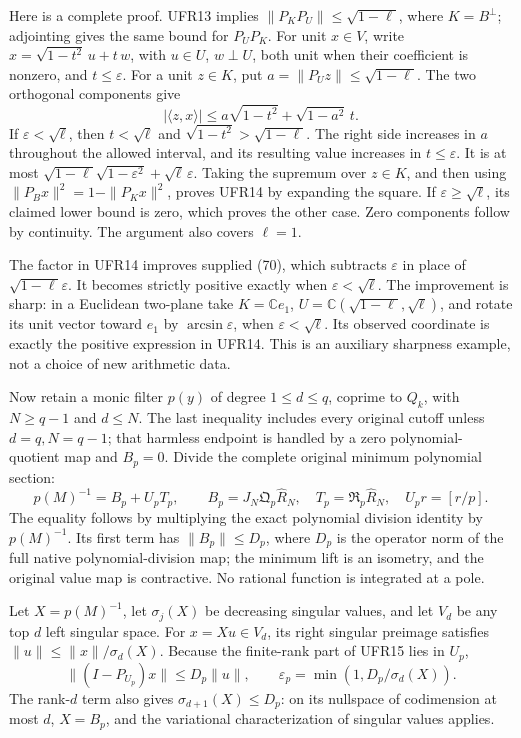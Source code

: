 Here is a complete proof. UFR13 implies \(\|P_KP_U\|\le\sqrt{1-\ell}\), where \(K=B^\perp\); adjointing gives the same bound for \(P_UP_K\). For unit \(x\in V\), write \(x=\sqrt{1-t^2}\,u+t\,w\), with \(u\in U\), \(w\perp U\), both unit when their coefficient is nonzero, and \(t\le\varepsilon\). For a unit \(z\in K\), put \(a=\|P_Uz\|\le\sqrt{1-\ell}\). The two orthogonal components give \[
|\langle z,x\rangle|
\le a\sqrt{1-t^2}+\sqrt{1-a^2}\,t.
\] If \(\varepsilon<\sqrt\ell\), then \(t<\sqrt\ell\) and \(\sqrt{1-t^2}>\sqrt{1-\ell}\). The right side increases in \(a\) throughout the allowed interval, and its resulting value increases in \(t\le\varepsilon\). It is at most \(\sqrt{1-\ell}\sqrt{1-\varepsilon^2}+\sqrt\ell\,\varepsilon\). Taking the supremum over \(z\in K\), and then using \(\|P_Bx\|^2=1-\|P_Kx\|^2\), proves UFR14 by expanding the square. If \(\varepsilon\ge\sqrt\ell\), its claimed lower bound is zero, which proves the other case. Zero components follow by continuity. The argument also covers \(\ell=1\).

The factor in UFR14 improves supplied (70), which subtracts \(\varepsilon\) in place of \(\sqrt{1-\ell}\varepsilon\). It becomes strictly positive exactly when \(\varepsilon<\sqrt\ell\). The improvement is sharp: in a Euclidean two-plane take \(K=\mathbb Ce_1\), \(U=\mathbb C(\sqrt{1-\ell},\sqrt\ell)\), and rotate its unit vector toward \(e_1\) by \(\arcsin\varepsilon\), when \(\varepsilon<\sqrt\ell\). Its observed coordinate is exactly the positive expression in UFR14. This is an auxiliary sharpness example, not a choice of new arithmetic data.

Now retain a monic filter \(p(y)\) of degree \(1\le d\le q\), coprime to \(Q_k\), with \(N\ge q-1\) and \(d\le N\). The last inequality includes every original cutoff unless \(d=q,N=q-1\); that harmless endpoint is handled by a zero polynomial-quotient map and \(B_p=0\). Divide the complete original minimum polynomial section: \[
p(M)^{-1}=B_p+U_pT_p,\qquad
B_p=J_N\mathfrak Q_p\widehat R_N,\quad
T_p=\mathfrak R_p\widehat R_N,\quad U_pr=[r/p].
\tag{UFR15}
\] The equality follows by multiplying the exact polynomial division identity by \(p(M)^{-1}\). Its first term has \(\|B_p\|\le D_p\), where \(D_p\) is the operator norm of the full native polynomial-division map; the minimum lift is an isometry, and the original value map is contractive. No rational function is integrated at a pole.

Let \(X=p(M)^{-1}\), let \(\sigma_j(X)\) be decreasing singular values, and let \(V_d\) be any top \(d\) left singular space. For \(x=Xu\in V_d\), its right singular preimage satisfies \(\|u\|\le\|x\|/\sigma_d(X)\). Because the finite-rank part of UFR15 lies in \(U_p\), \[
\|(I-P_{U_p})x\|\le D_p\|u\|,\qquad
\varepsilon_p=\min(1,D_p/\sigma_d(X)).
\] The rank-\(d\) term also gives \(\sigma_{d+1}(X)\le D_p\): on its nullspace of codimension at most \(d\), \(X=B_p\), and the variational characterization of singular values applies.

